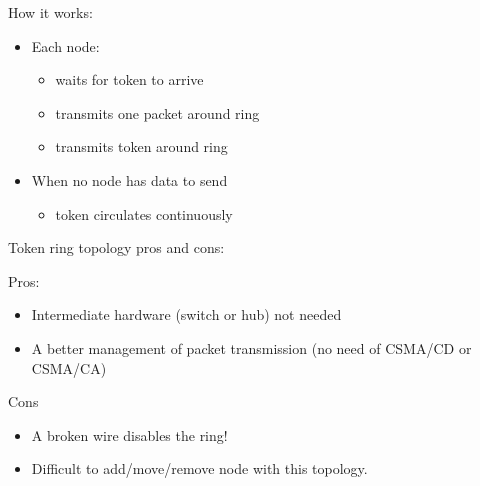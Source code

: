 \documentclass{beamer}[10pt, usepdftitle=false, handout]
\begin{document}
	\begin{frame}
	
	How it works:
	\vspace*{1em}
		
	\begin{itemize}
	\item{Each node:
		\begin{itemize}
			\item{waits for token to arrive}
			\item{transmits one packet around ring}
			\item{transmits token around ring}
		\end{itemize}			
	}
	\item{When no node has data to send
		\begin{itemize}
			\item{token circulates continuously}
		\end{itemize}			
	}	
	\end{itemize}		
		
	
	\end{frame}	
	
	\begin{frame}
	
	Token ring topology pros and cons:
	\vspace*{1em}	

	Pros:
	\vspace*{0.5em}		
	
	\begin{itemize}
	\item{Intermediate hardware (switch or hub) not needed}
	\item{A better management of packet transmission (no need of CSMA/CD or CSMA/CA)}
	\end{itemize}
	
	Cons
	\vspace*{0.5em}	
				
	\begin{itemize}
	\item{A broken wire disables the ring!}
	\item{Difficult to add/move/remove node with this topology.}
	\end{itemize}
				
	
	\end{frame}	
	
\end{document}
